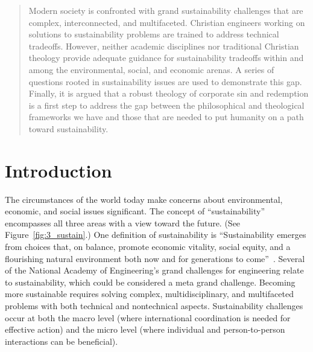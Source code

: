 \documentclass[12pt]{article}
\date{}                           %
\begin{document}
	
\maketitle

\begin{abstract}
\noindent
Modern society is confronted with grand sustainability challenges that are 
complex, interconnected, and multifaceted.
Christian engineers working on solutions to sustainability problems are trained 
to address technical tradeoffs.
However, neither academic disciplines nor traditional Christian theology provide adequate guidance 
for sustainability tradeoffs within and among
the environmental, social, and economic arenas. A series of questions rooted in sustainability issues are used to demonstrate
this gap. Finally, it is argued that a robust theology of corporate sin and redemption is a first step to address the gap 
between the philosophical and theological frameworks we have and those that are needed to put humanity on a path toward sustainability. 


\end{abstract}


\section{Introduction}
\label{sec:introduction}

The circumstances of the world today make
concerns about environmental, economic, and social 
issues significant. 
The concept of ``sustainability'' encompasses all three areas
with a view toward the future. 
(See Figure~\ref{fig:3_sustain}.)
One definition of sustainability is
``Sustainability emerges from choices that, on balance, 
promote economic vitality, social equity, and a flourishing natural environment 
both now and for generations to come''~\autocite{Calvin-College-2017}.
Several of the National Academy of Engineering's
grand challenges for engineering relate to sustainability, 
which could be considered a meta grand challenge.
Becoming more sustainable requires solving 
complex, multidisciplinary, and multifaceted problems
with both technical and nontechnical aspects. 
Sustainability challenges occur at both the 
macro level (where international coordination is needed for effective action) and
the micro level (where individual and person-to-person interactions can be beneficial). 
\end{document}
